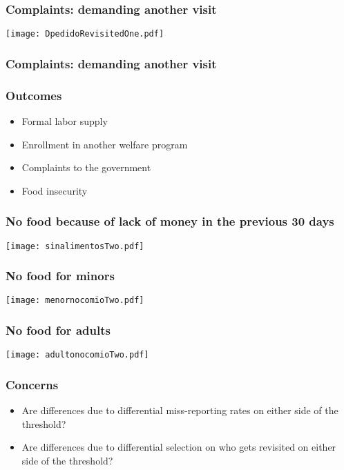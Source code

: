 \documentclass{beamer}
\begin{document}
\begin{frame}
\frametitle{Complaints: demanding another visit}
\begin{center}
	\texttt{[image: DpedidoRevisitedOne.pdf]}
	\label{DpedidoRevisitedOne}
\end{center}
\end{frame}

\begin{frame}
\frametitle{Complaints: demanding another visit}
\begin{figure}
	
\end{figure}
\end{frame}

\begin{frame}
\frametitle{Outcomes}
\begin{itemize}
	\item {\color{gray}Formal labor supply}
	\item {\color{gray}Enrollment in another welfare program}
	\item {\color{gray}Complaints to the government}
	\item Food insecurity
\end{itemize}
\end{frame}

\begin{frame}
\frametitle{No food because of lack of money in the previous 30 days}
\begin{center}
	\texttt{[image: sinalimentosTwo.pdf]}
	\label{sinalimentosTwo}
\end{center}
\end{frame}

\begin{frame}
\frametitle{No food for minors}
\begin{center}
\texttt{[image: menornocomioTwo.pdf]}
\label{menornocomioTwo}
\end{center}
\end{frame}

\begin{frame}
\frametitle{No food for adults}
\begin{center}
\texttt{[image: adultonocomioTwo.pdf]}
\label{adultonocomioTwo}
\end{center}
\end{frame}

\begin{frame}
\frametitle{Concerns}
\begin{itemize}
\item Are differences due to differential miss-reporting rates on either side of the threshold?
\item {\color{gray}Are differences due to differential selection on who gets revisited on either side of the threshold?}
\end{itemize}
\end{frame}
\end{document}
